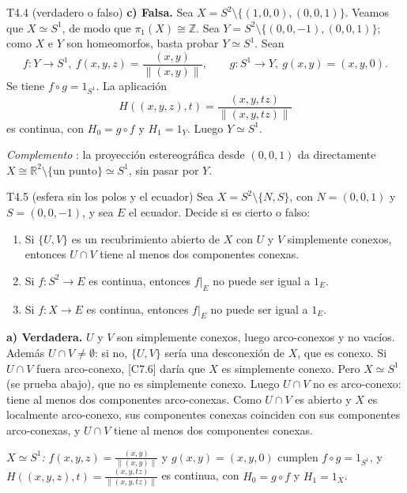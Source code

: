 \begin{ejercicio}{T4.4 (verdadero o falso)}
\textbf{c) Falsa.} Sea $X = S^2 \setminus \{(1,0,0),(0,0,1)\}$. Veamos que $X \simeq S^1$, de modo que $\pi_1(X) \cong \mathbb{Z}$. Sea $Y = S^2 \setminus \{(0,0,-1),(0,0,1)\}$; como $X$ e $Y$ son homeomorfos, basta probar $Y \simeq S^1$. Sean
\[ f \colon Y \to S^1,\ f(x,y,z) = \frac{(x,y)}{\|(x,y)\|}, \qquad g \colon S^1 \to Y,\ g(x,y) = (x,y,0). \]
Se tiene $f \circ g = 1_{S^1}$. La aplicación
\[ H((x,y,z),t) = \frac{(x,y,tz)}{\|(x,y,tz)\|} \]
es continua, con $H_0 = g \circ f$ y $H_1 = 1_Y$. Luego $Y \simeq S^1$.

\emph{Complemento} \fuentepropia: la proyección estereográfica desde $(0,0,1)$ da directamente $X \cong \mathbb{R}^2 \setminus \{\text{un punto}\} \simeq S^1$, sin pasar por $Y$.
\end{ejercicio}

\begin{ejercicio}{T4.5 (esfera sin los polos y el ecuador)}
Sea $X = S^2 \setminus \{N,S\}$, con $N = (0,0,1)$ y $S = (0,0,-1)$, y sea $E$ el ecuador. Decide si es cierto o falso:
\begin{enumerate}
    \item[a)] Si $\{U,V\}$ es un recubrimiento abierto de $X$ con $U$ y $V$ simplemente conexos, entonces $U \cap V$ tiene al menos dos componentes conexas.
    \item[b)] Si $f \colon S^2 \to E$ es continua, entonces $f|_E$ no puede ser igual a $1_E$.
    \item[c)] Si $f \colon X \to E$ es continua, entonces $f|_E$ no puede ser igual a $1_E$.
\end{enumerate}

\sol {} \quad {}

\textbf{a) Verdadera.} $U$ y $V$ son simplemente conexos, luego arco-conexos y no vacíos. Además $U \cap V \neq \emptyset$: si no, $\{U,V\}$ sería una desconexión de $X$, que es conexo. Si $U \cap V$ fuera arco-conexo, [C7.6] daría que $X$ es simplemente conexo. Pero $X \simeq S^1$ (se prueba abajo), que no es simplemente conexo. Luego $U \cap V$ no es arco-conexo: tiene al menos dos componentes arco-conexas. Como $U \cap V$ es abierto y $X$ es localmente arco-conexo, sus componentes conexas coinciden con sus componentes arco-conexas, y $U \cap V$ tiene al menos dos componentes conexas.

\emph{$X \simeq S^1$:} $f(x,y,z) = \frac{(x,y)}{\|(x,y)\|}$ y $g(x,y) = (x,y,0)$ cumplen $f \circ g = 1_{S^1}$, y $H((x,y,z),t) = \frac{(x,y,tz)}{\|(x,y,tz)\|}$ es continua, con $H_0 = g \circ f$ y $H_1 = 1_X$.


\end{ejercicio}
